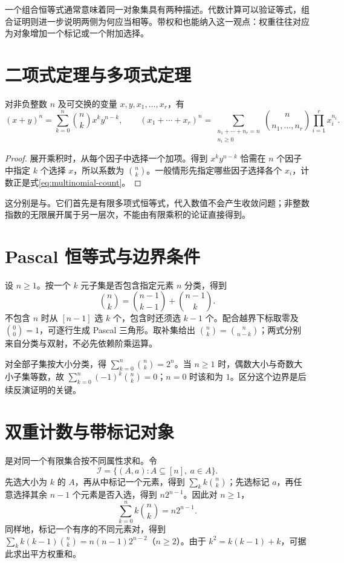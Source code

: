 \documentclass[UTF8,12pt,a4paper,fontset=fandol]{ctexbook}
\begin{document}
一个组合恒等式通常意味着同一对象集具有两种描述。代数计算可以验证等式，组合证明则进一步说明两侧为何应当相等。带权和也能纳入这一观点：权重往往对应为对象增加一个标记或一个附加选择。

\section{二项式定理与多项式定理}

\begin{theorem}
对非负整数 $n$ 及可交换的变量 $x,y,x_1,\ldots,x_r$，有
\[
  (x+y)^n=\sum_{k=0}^n\binom nk x^ky^{n-k},\qquad
  (x_1+\cdots+x_r)^n=
  \sum_{\substack{n_1+\cdots+n_r=n\\n_i\ge0}}
  \binom{n}{n_1,\ldots,n_r}\prod_{i=1}^r x_i^{n_i}.
\]
\end{theorem}
\begin{proof}
展开乘积时，从每个因子中选择一个加项。得到 $x^ky^{n-k}$ 恰需在 $n$ 个因子中指定 $k$ 个选择 $x$，所以系数为 $\binom nk$。一般情形先指定哪些因子选择各个 $x_i$，计数正是式\eqref{eq:multinomial-count}。
\end{proof}

这分别是与。它们首先是有限多项式恒等式，代入数值不会产生收敛问题；非整数指数的无限展开属于另一层次，不能由有限乘积的论证直接得到。

\section{Pascal 恒等式与边界条件}

设 $n\ge1$。按一个 $k$ 元子集是否包含指定元素 $n$ 分类，得到
\[
  \binom nk=\binom{n-1}{k-1}+\binom{n-1}{k}.
\]
不包含 $n$ 时从 $[n-1]$ 选 $k$ 个，包含时还须选 $k-1$ 个。配合越界下标取零及 $\binom00=1$，可逐行生成 Pascal 三角形。取补集给出 $\binom nk=\binom n{n-k}$；两式分别来自分类与双射，不必先依赖阶乘运算。

对全部子集按大小分类，得 $\sum_{k=0}^n\binom nk=2^n$。当 $n\ge1$ 时，偶数大小与奇数大小子集等数，故 $\sum_{k=0}^n(-1)^k\binom nk=0$；$n=0$ 时该和为 $1$。区分这个边界是后续反演证明的关键。

\section{双重计数与带标记对象}

是对同一个有限集合按不同属性求和。令
\[
  \mathcal I=\{(A,a):A\subseteq[n],\ a\in A\}.
\]
先选大小为 $k$ 的 $A$，再从中标记一个元素，得到 $\sum_k k\binom nk$；先选标记 $a$，再任意选择其余 $n-1$ 个元素是否入选，得到 $n2^{n-1}$。因此对 $n\ge1$，
\begin{equation}
  \sum_{k=0}^n k\binom nk=n2^{n-1}.
  \label{eq:marked-subsets}
\end{equation}
同样地，标记一个有序的不同元素对，得到 $\sum_k k(k-1)\binom nk=n(n-1)2^{n-2}$（$n\ge2$）。由于 $k^2=k(k-1)+k$，可据此求出平方权重和。
\end{document}
